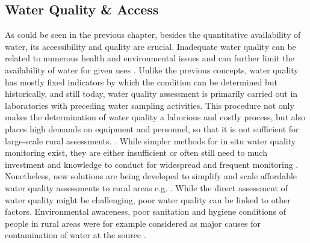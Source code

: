 {%

\subsection{Water Quality \& Access}

As could be seen in the previous chapter, besides the quantitative availability of water, its accessibility and quality are crucial. Inadequate water quality can be related to numerous health and environmental issues and can further limit the availability of water for given uses \autocite{rcrcFORECASTBASEDFINANCINGEARLY2020, faoCopingWaterScarcity2012}. Unlike the previous concepts, water quality has mostly fixed indicators by which the condition can be determined but historically, and still today, water quality assessment is primarily carried out in laboratories with preceding water sampling activities. This procedure not only makes the determination of water quality a laborious and costly process, but also places high demands on equipment and personnel, so that it is not sufficient for large-scale rural assessments. \autocite{tariqOpenSourceWater2021,worldmeteorologicalorganizationPlanningWaterqualityMonitoring2013}. While simpler methods for in situ water quality monitoring exist, they are either insufficient or often still need to much investment and knowledge to conduct for widespread and frequent monitoring \autocite{worldmeteorologicalorganizationPlanningWaterqualityMonitoring2013}. Nonetheless, new solutions are being developed to simplify and scale affordable water quality assessments to rural areas e.g. \autocite{ighaloComprehensiveReviewWater2020,tariqOpenSourceWater2021}. While the direct assessment of water quality might be challenging, poor water quality can be linked to other factors. Environmental awareness, poor sanitation and hygiene conditions of people in rural areas were for example considered as major causes for contamination of water at the source \autocite{zamxakaMicrobiologicalPhysicochemicalAssessment2004}.

}
